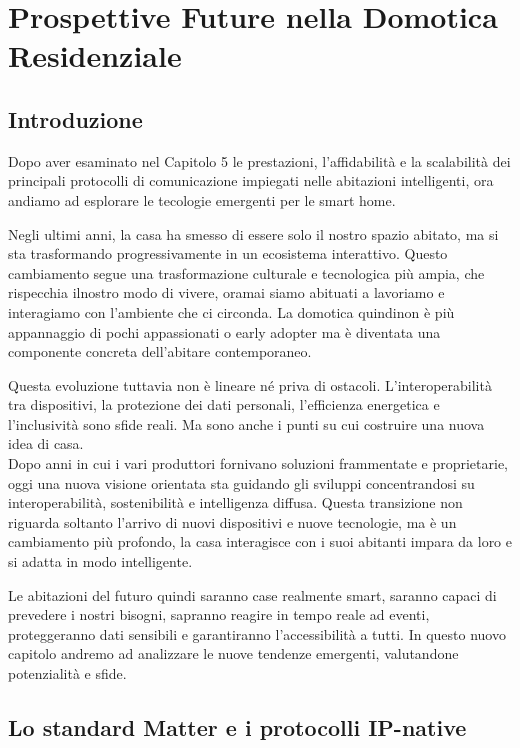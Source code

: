 \chapter{Prospettive Future nella Domotica Residenziale}

\section{Introduzione}

Dopo aver esaminato nel Capitolo 5 le prestazioni, l'affidabilità e la scalabilità dei principali protocolli di comunicazione impiegati nelle abitazioni intelligenti, ora andiamo ad esplorare le tecologie emergenti per le smart home.

Negli ultimi anni, la casa ha smesso di essere solo il nostro spazio abitato, ma si sta trasformando progressivamente in un ecosistema interattivo. Questo cambiamento segue una trasformazione culturale e tecnologica più ampia, che rispecchia ilnostro modo di vivere, oramai siamo abituati a lavoriamo e interagiamo con l’ambiente che ci circonda. La domotica quindinon è più appannaggio di pochi appassionati o early adopter ma è diventata una componente concreta dell’abitare contemporaneo.

Questa evoluzione tuttavia non è lineare né priva di ostacoli. L’interoperabilità tra dispositivi, la protezione dei dati personali, l’efficienza energetica e l’inclusività sono sfide reali. Ma sono anche i punti su cui costruire una nuova idea di casa.\\

Dopo anni in cui i vari produttori fornivano soluzioni frammentate e proprietarie, oggi una nuova visione orientata sta guidando gli sviluppi concentrandosi su interoperabilità, sostenibilità e intelligenza diffusa. Questa transizione non riguarda soltanto l’arrivo di nuovi dispositivi e nuove tecnologie, ma è un cambiamento più profondo, la casa interagisce con i suoi abitanti impara da loro e si adatta in modo intelligente.

Le abitazioni del futuro quindi saranno case realmente smart, saranno capaci di prevedere i nostri bisogni, sapranno reagire in tempo reale ad eventi, proteggeranno dati sensibili e garantiranno l'accessibilità a tutti. In questo nuovo capitolo andremo ad analizzare le nuove tendenze emergenti, valutandone potenzialità e sfide.

\section{Lo standard Matter e i protocolli IP-native}


